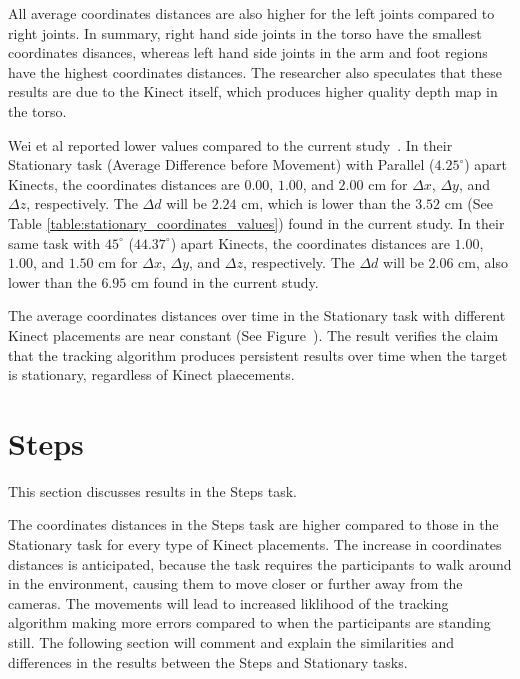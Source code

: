 All average coordinates distances are also higher for the left joints compared to right joints. In summary, right hand side joints in the torso have the smallest coordinates disances, whereas left hand side joints in the arm and foot regions have the highest coordinates distances. The researcher also speculates that these results are due to the Kinect itself, which produces higher quality depth map in the torso.

Wei et al reported lower values compared to the current study~\cite{wei_kinect_calibration}. In their Stationary task (Average Difference before Movement) with Parallel ($4.25^{\circ}$) apart Kinects, the coordinates distances are $0.00$, $1.00$, and $2.00$ cm for $\Delta x$, $\Delta y$, and $\Delta z$, respectively. The $\Delta d$ will be $2.24$ cm, which is lower than the $3.52$ cm (See Table \ref{table:stationary_coordinates_values}) found in the current study. In their same task with $45^{\circ}$ ($44.37^{\circ}$) apart Kinects, the coordinates distances are $1.00$, $1.00$, and $1.50$ cm for $\Delta x$, $\Delta y$, and $\Delta z$, respectively. The $\Delta d$ will be $2.06$ cm, also lower than the $6.95$ cm found in the current study.

The average coordinates distances over time in the Stationary task with different Kinect placements are near constant (See Figure~). The result verifies the claim that the tracking algorithm produces persistent results over time when the target is stationary, regardless of Kinect plaecements.

\section{Steps}
\label{sec:discussion_steps}

This section discusses results in the Steps task.

The coordinates distances in the Steps task are higher compared to those in the Stationary task for every type of Kinect placements. The increase in coordinates distances is anticipated, because the task requires the participants to walk around in the environment, causing them to move closer or further away from the cameras. The movements will lead to increased liklihood of the tracking algorithm making more errors compared to when the participants are standing still. The following section will comment and explain the similarities and differences in the results between the Steps and Stationary tasks.

